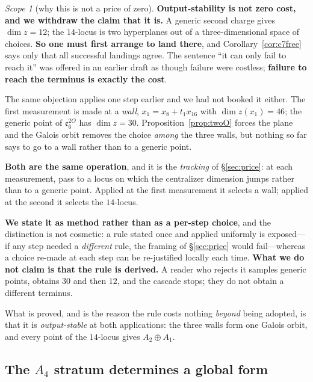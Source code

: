 \documentclass[11pt,reqno]{amsart}
\theoremstyle{plain}
\theoremstyle{definition}
\theoremstyle{remark}
\newtheorem{scope}[theorem]{Scope}
\newcommand{\ee}{\mathfrak{e}}
\begin{document}
\begin{scope}[why this is not a price of zero]\label{sc:c7price}
\textbf{Output-stability is not zero cost, and we withdraw the claim that it is.} A
generic second charge gives $\dim z=12$; the $14$-locus is two hyperplanes out of a
three-dimensional space of choices. \textbf{So one must first arrange to land there},
and Corollary~\ref{cor:c7free} says only that all successful landings agree. The
sentence ``it can only fail to reach it'' was offered in an earlier draft as though
failure were costless; \textbf{failure to reach the terminus is exactly the cost}.

The same objection applies one step earlier and we had not booked it either. The first
measurement is made at a \emph{wall}, $x_1=x_8+t_1x_{16}$ with $\dim z(x_1)=46$; the
generic point of $\ee_6^{2O}$ has $\dim z=30$. Proposition~\ref{prop:twoO} forces the
plane and the Galois orbit removes the choice \emph{among} the three walls, but nothing
so far says to go to a wall rather than to a generic point.

\textbf{Both are the same operation}, and it is the \emph{tracking} of
\S\ref{sec:price}: at each measurement, pass to a locus on which the centralizer
dimension jumps rather than to a generic point. Applied at the first measurement it
selects a wall; applied at the second it selects the $14$-locus.

\textbf{We state it as method rather than as a per-step choice}, and the distinction is
not cosmetic: a rule stated once and applied uniformly is exposed---if any step needed a
\emph{different} rule, the framing of \S\ref{sec:price} would fail---whereas a choice
re-made at each step can be re-justified locally each time. \textbf{What we do not claim
is that the rule is derived.} A reader who rejects it samples generic points, obtains
$30$ and then $12$, and the cascade stops; they do not obtain a different terminus.

What is proved, and is the reason the rule costs nothing \emph{beyond} being adopted, is
that it is \emph{output-stable} at both applications: the three walls form one Galois
orbit, and every point of the $14$-locus gives $A_2\oplus A_1$.
\end{scope}

\subsection{The $A_4$ stratum determines a global form}\label{sec:globalform}
\end{document}
